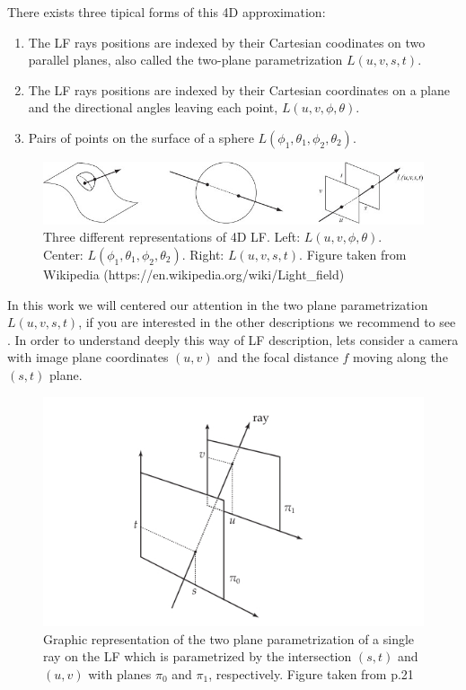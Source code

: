  There exists three tipical forms of this 4D approximation: 
\begin{enumerate}
\item The LF rays positions are indexed by their Cartesian coodinates on two parallel planes, also called the two-plane parametrization $L(u,v,s,t)$.
\item The LF rays positions are indexed by their Cartesian coordinates on a plane and the directional angles leaving each point, $L(u,v,\phi,\theta)$.
\item Pairs of points on the surface of a sphere $L(\phi_1,\theta_1,\phi_2,\theta_2)$.
\end{enumerate}

\begin{figure}[h!]
\centering
\includegraphics[width=1.0\textwidth]{./Diagrams/Light-field-parametrizations.jpg}
\caption{Three different representations of 4D LF. Left: $L(u,v,\phi,\theta)$. Center: $L(\phi_1,\theta_1,\phi_2,\theta_2)$. Right: $L(u,v,s,t)$. Figure taken from Wikipedia (https://en.wikipedia.org/wiki/Light\_field)}
\end{figure}

In this work we will centered our attention in the two plane parametrization $L(u,v,s,t)$, if you are interested in the other descriptions we recommend to see \cite{Liang}. In order to understand deeply this way of LF description, lets consider a camera with image plane coordinates $(u,v)$ and the focal distance $f$ moving along the $(s,t)$ plane. 

\begin{figure}[h!]
\centering
\includegraphics[width=1.0\textwidth]{./Diagrams/two-planes_param.jpg}
\caption{Graphic representation of the two plane parametrization of a single ray on the LF which is parametrized by the intersection $(s,t)$ and $(u,v)$ with planes $\pi_0$ and $\pi_1$, respectively. Figure taken from \cite{Kim-Disney} p.21}
\end{figure}

